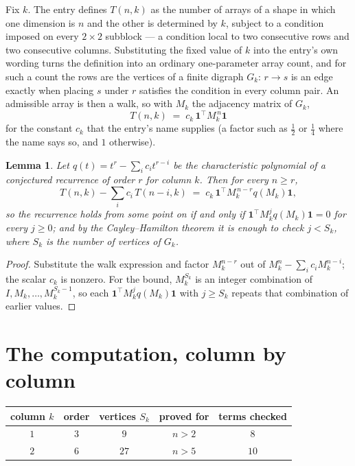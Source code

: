 \documentclass[11pt,a4paper]{article}
\theoremstyle{plain}
\newtheorem{lemma}[theorem]{Lemma}
\theoremstyle{definition}
\begin{document}
Fix $k$. The entry defines $T(n,k)$ as the number of arrays of a shape in which one dimension
is $n$ and the other is determined by $k$, subject to a condition imposed on every
$2\times2$ subblock --- a condition local to two consecutive rows and two consecutive columns.
Substituting the fixed value of $k$ into the entry's own wording turns the definition into an
ordinary one-parameter array count, and for such a count the rows are the vertices of a finite
digraph $G_k$: $r\to s$ is an edge exactly when placing $s$ under $r$ satisfies the condition
in every column pair. An admissible array is then a walk, so with $M_k$ the adjacency matrix
of $G_k$,
\[
T(n,k)\;=\;c_k\,\mathbf{1}^{\!\top}M_k^{\,n}\mathbf{1}
\]
for the constant $c_k$ that the entry's name supplies (a factor such as $\tfrac12$ or
$\tfrac14$ where the name says so, and $1$ otherwise).

\begin{lemma}\label{lem:crit}
Let $q(t)=t^{r}-\sum_i c_it^{r-i}$ be the characteristic polynomial of a conjectured
recurrence of order $r$ for column $k$. Then for every $n\ge r$,
\[
T(n,k)-\sum_i c_i\,T(n-i,k)\;=\;c_k\,\mathbf{1}^{\!\top}M_k^{\,n-r}q(M_k)\mathbf{1},
\]
so the recurrence holds from some point on if and only if
$\mathbf{1}^{\!\top}M_k^{j}q(M_k)\mathbf{1}=0$ for every $j\ge0$; and by the
Cayley--Hamilton theorem it is enough to check $j<S_k$, where $S_k$ is the number of vertices
of $G_k$.
\end{lemma}

\begin{proof}
Substitute the walk expression and factor $M_k^{n-r}$ out of $M_k^{n}-\sum_ic_iM_k^{n-i}$;
the scalar $c_k$ is nonzero. For the bound, $M_k^{S_k}$ is an integer combination of
$I,M_k,\dots,M_k^{S_k-1}$, so each $\mathbf{1}^{\!\top}M_k^{j}q(M_k)\mathbf{1}$ with
$j\ge S_k$ repeats that combination of earlier values.
\end{proof}

\section{The computation, column by column}

\begin{center}
\begin{tabular}{ccccc}
column $k$ & order & vertices $S_k$ & proved for & terms checked \\ \hline
$1$ & $3$ & $9$ & $n>2$ & $8$ \\
$2$ & $6$ & $27$ & $n>5$ & $10$ \\
\end{tabular}
\end{center}
\end{document}

